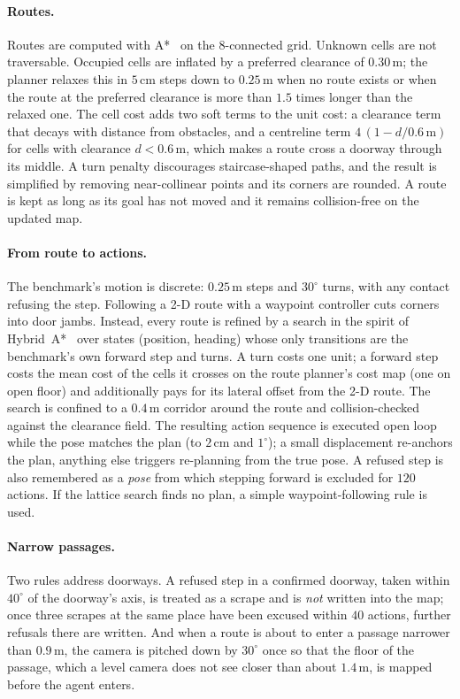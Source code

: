 \documentclass[10pt]{article}
\newcommand{\m}{\,\mathrm{m}}
\newcommand{\cm}{\,\mathrm{cm}}
\newcommand{\degree}{^{\circ}}
\begin{document}
\paragraph{Routes.} Routes are computed with A*~\citep{hart1968formal} on the
8-connected grid. Unknown cells are not traversable. Occupied cells are
inflated by a preferred clearance of $0.30\m$; the planner relaxes this in
$5\cm$ steps down to $0.25\m$ when no route exists or when the route at the
preferred clearance is more than $1.5$ times longer than the relaxed one. The
cell cost adds two soft terms to the unit cost: a clearance term that decays
with distance from obstacles, and a centreline term
$4\,(1-d/0.6\m)$ for cells with clearance $d<0.6\m$, which makes a route cross
a doorway through its middle. A turn penalty discourages staircase-shaped
paths, and the result is simplified by removing near-collinear points and its
corners are rounded. A route is kept as long as its goal has not moved and it
remains collision-free on the updated map.

\paragraph{From route to actions.} The benchmark's motion is discrete:
$0.25\m$ steps and $30\degree$ turns, with any contact refusing the step.
Following a 2-D route with a waypoint controller cuts corners into door jambs.
Instead, every route is refined by a search in the spirit of
Hybrid~A*~\citep{dolgov2010path} over states (position, heading) whose only
transitions are the benchmark's own forward step and turns. A turn costs one
unit; a forward step costs the mean cost of the cells it crosses on the route
planner's cost map (one on open floor) and additionally pays for its lateral
offset from the 2-D route. The search is confined to a $0.4\m$ corridor around
the route and collision-checked against the clearance field. The resulting
action sequence
is executed open loop while the pose matches the plan (to $2\cm$ and
$1\degree$); a small displacement re-anchors the plan, anything else triggers
re-planning from the true pose. A refused step is also remembered as a
\emph{pose} from which stepping forward is excluded for $120$ actions. If the
lattice search finds no plan, a simple waypoint-following rule is used.

\paragraph{Narrow passages.} Two rules address doorways. A refused step in a
confirmed doorway, taken within $40\degree$ of the doorway's axis, is treated
as a scrape and is \emph{not} written into the map; once three scrapes at the
same place have been excused within $40$ actions, further refusals there are
written. And when a route is about to enter a passage
narrower than $0.9\m$, the camera is pitched down by $30\degree$ once so that
the floor of the passage, which a level camera does not see closer than about
$1.4\m$, is mapped before the agent enters.
\end{document}
